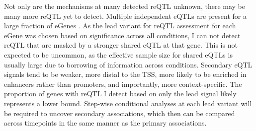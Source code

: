 Not only are the mechanisms at many detected reQTL unknown, there may be many more reQTL yet to detect.
%
Multiple independent eQTLs are present for a large fraction of eGenes \autocite{zeng2019ComprehensiveMultipleEQTL}.
As the lead variant for reQTL assessment for each eGene was chosen based on significance across all conditions, I can not detect reQTL that are masked by a stronger shared eQTL at that gene.
This is not expected to be uncommon, as the effective sample size for shared eQTLs is usually large due to borrowing of information across conditions.
Secondary \gls{eQTL} signals tend to be weaker, more distal to the TSS, more likely to be enriched in enhancers rather than promoters, and importantly, more context-specific\autocite{vandiedonck2017GeneticAssociationMolecular,dobbyn2018LandscapeConditionalEQTL,rotival2019CharacterisingGeneticBasis}.
The proportion of genes with reQTL I detect based on only the lead signal likely represents a lower bound.
Step-wise conditional analyses at each lead variant will be required to uncover secondary associations, 
which then can be compared across timepoints in the same manner as the primary associations.

